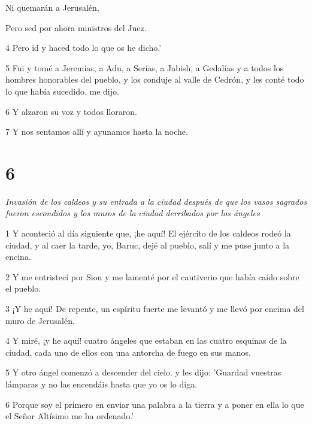 \par Ni quemarán a Jerusalén,

\par Pero sed por ahora ministros del Juez.

\par 4 Pero id y haced todo lo que os he dicho.'


\par 5 Fui y tomé a Jeremías, a Adu, a Serías, a Jabish, a Gedalías y a todos los hombres honorables del pueblo, y los conduje al valle de Cedrón, y les conté todo lo que había sucedido. me dijo.

\par 6 Y alzaron su voz y todos lloraron.

\par 7 Y nos sentamos allí y ayunamos hasta la noche.

\chapter{6}

\par \textit{Invasión de los caldeos y su entrada a la ciudad después de que los vasos sagrados fueron escondidos y los muros de la ciudad derribados por los ángeles}

\par 1 Y aconteció al día siguiente que, ¡he aquí! El ejército de los caldeos rodeó la ciudad, y al caer la tarde, yo, Baruc, dejé al pueblo, salí y me puse junto a la encina.

\par 2 Y me entristecí por Sion y me lamenté por el cautiverio que había caído sobre el pueblo.

\par 3 ¡Y he aquí! De repente, un espíritu fuerte me levantó y me llevó por encima del muro de Jerusalén.

\par 4 Y miré, ¡y he aquí! cuatro ángeles que estaban en las cuatro esquinas de la ciudad, cada uno de ellos con una antorcha de fuego en sus manos.

\par 5 Y otro ángel comenzó a descender del cielo. y les dijo: 'Guardad vuestras lámparas y no las encendáis hasta que yo os lo diga.

\par 6 Porque soy el primero en enviar una palabra a la tierra y a poner en ella lo que el Señor Altísimo me ha ordenado.'

